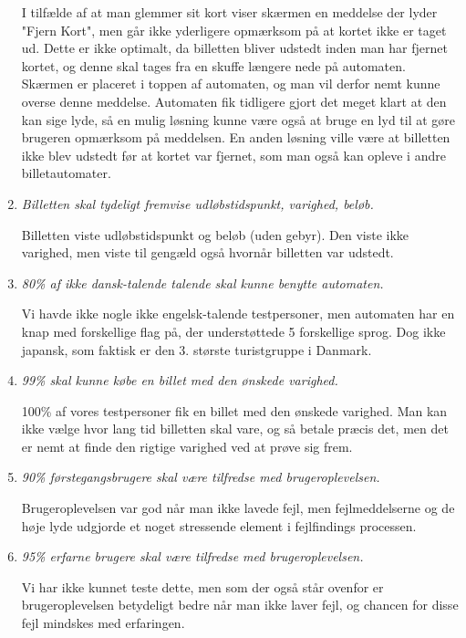 \documentclass[10pt]{article}
\begin{document}
\begin{enumerate}
  I tilfælde af at man glemmer sit kort viser skærmen en meddelse der
  lyder "Fjern Kort", men går ikke yderligere opmærksom på at kortet
  ikke er taget ud. Dette er ikke optimalt, da billetten bliver
  udstedt inden man har fjernet kortet, og denne skal tages fra en
  skuffe længere nede på automaten. Skærmen er placeret i toppen af
  automaten, og man vil derfor nemt kunne overse denne
  meddelse. Automaten fik tidligere gjort det meget klart at den kan
  sige lyde, så en mulig løsning kunne være også at bruge en lyd til
  at gøre brugeren opmærksom på meddelsen. En anden løsning ville være
  at billetten ikke blev udstedt før at kortet var fjernet, som man
  også kan opleve i andre billetautomater. 

\item {\it Billetten skal tydeligt fremvise udløbstidspunkt, varighed, beløb.}

  Billetten viste udløbstidspunkt og beløb (uden gebyr). Den viste ikke
  varighed, men viste til gengæld også hvornår billetten var udstedt. 

\item {\it 80\% af ikke dansk-talende talende skal kunne benytte automaten.}

  Vi havde ikke nogle ikke engelsk-talende testpersoner, men automaten
  har en knap med forskellige flag på, der understøttede 5 forskellige
  sprog. Dog ikke japansk, som faktisk er den 3. største turistgruppe i
  Danmark.
  

\item {\it 99\% skal kunne købe en billet med den ønskede varighed.}

  100\% af vores testpersoner fik en billet med den ønskede varighed. Man
  kan ikke vælge hvor lang tid billetten skal vare, og så betale præcis
  det, men det er nemt at finde den rigtige varighed ved at prøve
  sig frem.

\item {\it 90\% førstegangsbrugere skal være tilfredse med brugeroplevelsen.}

  Brugeroplevelsen var god når man ikke lavede fejl, men fejlmeddelserne
  og de høje lyde udgjorde et noget stressende element i fejlfindings
  processen.

\item {\it 95\% erfarne brugere skal være tilfredse med brugeroplevelsen.}

  Vi har ikke kunnet teste dette, men som der også står ovenfor er
  brugeroplevelsen betydeligt bedre når man ikke laver fejl, og chancen
  for disse fejl mindskes med erfaringen.
\end{enumerate}
\end{document}
